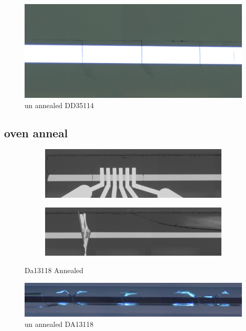 \begin{figure}
    \centering
    \includegraphics[width=\textwidth]{fig/polishing/dd354114_8.jpg}
    \caption{un annealed DD35114}
    \label{fig:my_label}
\end{figure}


\subsection{oven anneal}
\begin{figure}[h]
\centering
\begin{subfigure}{\textwidth}
  \centering
  \includegraphics[width=\linewidth]{fig/OA/e944190422_redo-dup1.jpg}
  \label{fig:sfig1}
\end{subfigure}%

\begin{subfigure}{\textwidth}
  \centering
  \includegraphics[width=\linewidth]{fig/OA/e944190422_redo-duplicate2.jpg}
  \label{fig:sfig2}
\end{subfigure}%

\caption{Da13118 Annealed }
\label{fig:si_sige}
\end{figure}


\begin{figure}[h]
    \centering
    \includegraphics[width=\textwidth]{fig/polishing/e944.jpg}
    \caption{un annealed DA13118}
    \label{fig:my_label}
\end{figure}


\cleardoublepage